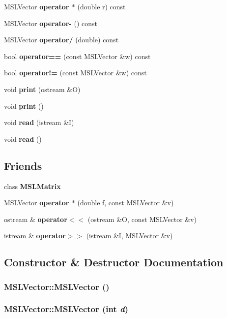 \begin{CompactItemize}
\item 
MSLVector {\bf operator $\ast$} (double r) const
\item 
MSLVector {\bf operator-} () const
\item 
MSLVector {\bf operator/} (double) const
\item 
bool {\bf operator==} (const MSLVector \&w) const
\item 
bool {\bf operator!=} (const MSLVector \&w) const
\item 
void {\bf print} (ostream \&O)
\item 
void {\bf print} ()
\item 
void {\bf read} (istream \&I)
\item 
void {\bf read} ()
\end{CompactItemize}
\subsection*{Friends}
\begin{CompactItemize}
\item 
class {\bf MSLMatrix}
\item 
MSLVector {\bf operator $\ast$} (double f, const MSLVector \&v)
\item 
ostream \& {\bf operator$<$$<$} (ostream \&O, const MSLVector \&v)
\item 
istream \& {\bf operator$>$$>$} (istream \&I, MSLVector \&v)
\end{CompactItemize}


\subsection{Constructor \& Destructor Documentation}
\subsubsection{\setlength{\rightskip}{0pt plus 5cm}MSLVector::MSLVector ()}\label{classMSLVector_a0}


\subsubsection{\setlength{\rightskip}{0pt plus 5cm}MSLVector::MSLVector (int {\em d})}\label{classMSLVector_a1}


